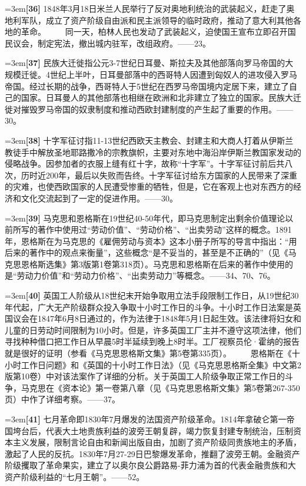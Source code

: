 \documentclass[UTF8,zihao=-4,a4paper]{ctexart}
\begin{document}
\noindent\hangindent=3em\textbf{[36]} 1848年3月18日米兰人民举行了反对奥地利统治的武装起义，赶走了奥地利军队，成立了资产阶级自由派和民主派领导的临时政府，推动了意大利其他各地的革命。  　　同一天，柏林人民也发动了武装起义，迫使国王宣布立即召开国民议会，制定宪法，撤出城内驻军，改组政府。——23。\par
\noindent\hangindent=3em\textbf{[37]} 民族大迁徙指公元3-7世纪日耳曼、斯拉夫及其他部落向罗马帝国的大规模迁徙。4世纪上半叶，日耳曼部落中的西哥特人因遭到匈奴人的进攻侵入罗马帝国。经过长期的战争，西哥特人于5世纪在西罗马帝国境内定居下来，建立了自己的国家。日耳曼人的其他部落也相继在欧洲和北非建立了独立的国家。民族大迁徙对摧毁罗马帝国的奴隶制度和推动西欧封建制度的产生起了重要的作用。——30。\par
\noindent\hangindent=3em\textbf{[38]} 十字军征讨指11-13世纪西欧天主教会、封建主和大商人打着从伊斯兰教徒手中解放圣地耶路撒冷的宗教旗帜，主要对东地中海沿岸伊斯兰教国家发动的侵略战争。因参加者的衣服上缝有红十字，故称“十字军”。十字军征讨前后共八次，历时近200年，最后以失败而告终。十字军征讨给东方国家的人民带来了深重的灾难，也使西欧国家的人民遭受惨重的牺牲，但是，它在客观上也对东西方的经济和文化交流起到了一定的促进作用。——30。\par
\noindent\hangindent=3em\textbf{[39]} 马克思和恩格斯在19世纪40-50年代，即马克思制定出剩余价值理论以前所写的著作中使用过“劳动价值”、“劳动价格”、“出卖劳动”这样的概念。1891年，恩格斯在为马克思的《雇佣劳动与资本》这本小册子所写的导言中指出：“用后来的著作中的观点来衡量”，这些概念“是不妥当的，甚至是不正确的”（见《马克思恩格斯选集》第3版第1卷第318页）。马克思和恩格斯在后来的著作中使用的是“劳动力价值”和“劳动力价格”、“出卖劳动力”等概念。——34、70、76。\par
\noindent\hangindent=3em\textbf{[40]} 英国工人阶级从18世纪末开始争取用立法手段限制工作日，从19世纪30年代起，广大无产阶级群众投入争取十小时工作日的斗争。十小时工作日法案是英国议会在1847年6月8日通过的，作为法律于1848年5月1日起生效。该法律将妇女和儿童的日劳动时间限制为10小时。但是，许多英国工厂主并不遵守这项法律，他们寻找种种借口把工作日从早晨5时半延续到晚上8时半。工厂视察员伦·霍纳的报告就是很好的证明（参看《马克思恩格斯文集》第5卷第335页）。  　　恩格斯在《十小时工作日问题》和《英国的十小时工作日法》（见《马克思恩格斯全集》中文第2版第10卷）中对该法案作了详细的分析。关于英国工人阶级争取正常工作日的斗争，马克思在《资本论》第一卷第八章（见《马克思恩格斯文集》第5卷第267-350页）中作了详细考察。——37。\par
\noindent\hangindent=3em\textbf{[41]} 七月革命即1830年7月爆发的法国资产阶级革命。1814年拿破仑第一帝国垮台后，代表大土地贵族利益的波旁王朝复辟，竭力恢复封建专制统治，压制资本主义发展，限制言论自由和新闻出版自由，加剧了资产阶级同贵族地主的矛盾，激起了人民的反抗。1830年7月27-29日巴黎爆发革命，推翻了波旁王朝。金融资产阶级攫取了革命果实，建立了以奥尔良公爵路易-菲力浦为首的代表金融贵族和大资产阶级利益的“七月王朝”。——52。\par
\end{document}
